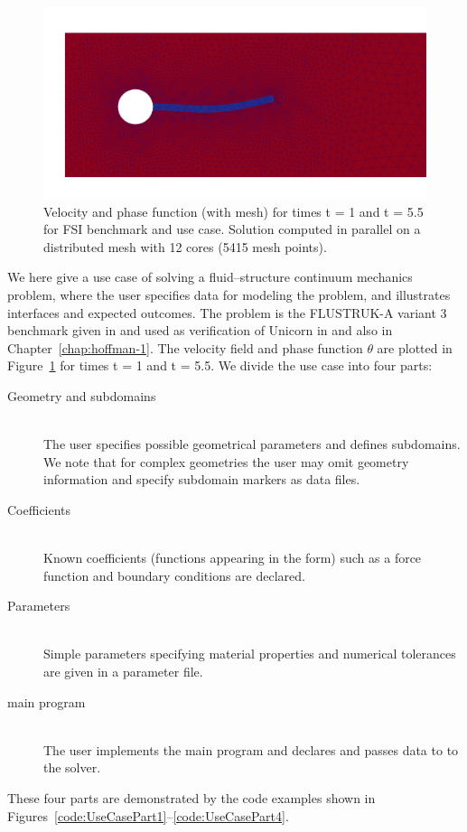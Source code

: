 \begin{figure}
  \includegraphics[width=\largefig]{chapters/hoffman-2/png/fsi3_theta_250.png}
  \caption{Velocity and phase function (with mesh) for times t = 1 and t = 5.5 for FSI benchmark and use case. Solution computed in parallel on a distributed mesh with 12 cores (5415 mesh points).}
  \label{fig:fsi2D_plot2}
\end{figure}

We here give a use case of solving a fluid--structure continuum
mechanics problem, where the user specifies data for modeling the
problem, and illustrates interfaces and expected outcomes. The problem
is the FLUSTRUK-A variant 3 benchmark given in \citep{HronTurek2005}
and used as verification of Unicorn
in \citep{HoffmanJanssonStockli2011} and also in
Chapter~\ref{chap:hoffman-1}. The velocity field and phase function
$\theta$ are plotted in Figure~\ref{fig:fsi2D_plot2} for times t = 1
and t = 5.5. We divide the use case into four parts:

\begin{description}
\item[Geometry and subdomains] \ \\ The user specifies possible
  geometrical parameters and defines subdomains. We note that for
  complex geometries the user may omit geometry information and
  specify subdomain markers as data files.
\item[Coefficients] \ \\ Known coefficients (functions appearing in the form)
  such as a force function and boundary conditions are declared.
\item[Parameters] \ \\ Simple parameters specifying material properties and numerical tolerances are given
in a parameter file.
\item[main program] \ \\ The user implements the main program and
  declares and passes data to to the solver.
\end{description}
These four parts are demonstrated by the code examples shown in
Figures~\ref{code:UseCasePart1}--\ref{code:UseCasePart4}.

